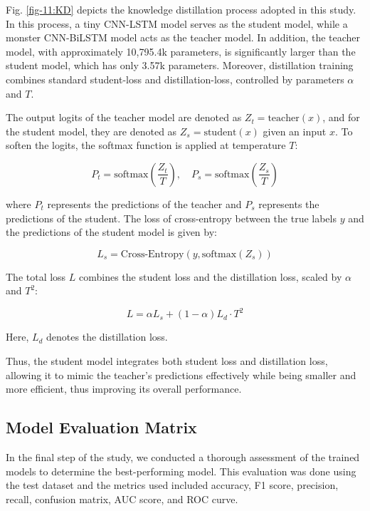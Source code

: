 \documentclass[conference]{IEEEtran}
\begin{document}
Fig. \ref{fig-11:KD} depicts the knowledge distillation process adopted in this study. In this process, a tiny CNN-LSTM model serves as the student model, while a monster CNN-BiLSTM model acts as the teacher model. In addition, the teacher model, with approximately 10,795.4k parameters, is significantly larger than the student model, which has only 3.57k parameters. Moreover, distillation training combines standard student-loss and distillation-loss, controlled by parameters $\alpha$ and $T$.

The output logits of the teacher model are denoted as $Z_t = \text{teacher}(x)$, and for the student model, they are denoted as $Z_s = \text{student}(x)$ given an input $x$. To soften the logits, the softmax function is applied at temperature $T$:

\begin{equation}
P_t = \text{softmax}\left(\frac{Z_t}{T}\right), \quad P_s = \text{softmax}\left(\frac{Z_s}{T}\right)
\end{equation}

where $P_t$ represents the predictions of the teacher and $P_s$ represents the predictions of the student. The loss of cross-entropy between the true labels $y$ and the predictions of the student model is given by:

\begin{equation}
L_s = \text{Cross-Entropy}(y, \text{softmax}(Z_s))
\end{equation}

The total loss $L$ combines the student loss and the distillation loss, scaled by $\alpha$ and $T^2$:

\begin{equation}
L = \alpha L_s + (1 - \alpha) L_d \cdot T^2
\end{equation}

Here, $L_d$ denotes the distillation loss.

Thus, the student model integrates both student loss and distillation loss, allowing it to mimic the teacher’s predictions effectively while being smaller and more efficient, thus improving its overall performance.

\subsection{Model Evaluation Matrix}

In the final step of the study, we conducted a thorough assessment of the trained models to determine the best-performing model. This evaluation was done using the test dataset and the metrics used included accuracy, F1 score, precision, recall, confusion matrix, AUC score, and ROC curve.
\end{document}
